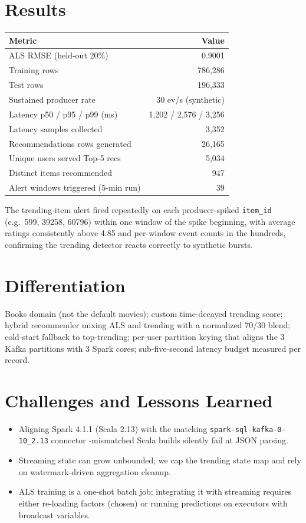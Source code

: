 \documentclass[11pt,a4paper]{article}
\begin{document}
\section{Results}
\begin{center}
\begin{tabular}{lr}
\toprule
\textbf{Metric} & \textbf{Value} \\
\midrule
ALS RMSE (held-out 20\%)            & 0.9001 \\
Training rows                        & 786{,}286 \\
Test rows                            & 196{,}333 \\
Sustained producer rate              & 30 ev/s (synthetic) \\
Latency p50 / p95 / p99 (ms)         & 1{,}202 / 2{,}576 / 3{,}256 \\
Latency samples collected            & 3{,}352 \\
Recommendations rows generated       & 26{,}165 \\
Unique users served Top-5 recs       & 5{,}034 \\
Distinct items recommended           & 947 \\
Alert windows triggered (5-min run)  & 39 \\
\bottomrule
\end{tabular}
\end{center}

The trending-item alert fired repeatedly on each producer-spiked
\texttt{item\_id} (e.g.\ 599, 39258, 60796) within one window of the spike
beginning, with average ratings consistently above 4.85 and per-window event
counts in the hundreds, confirming the trending detector reacts correctly to
synthetic bursts.

\section{Differentiation}
Books domain (not the default movies); custom time-decayed trending score;
hybrid recommender mixing ALS and trending with a normalized 70/30 blend;
cold-start fallback to top-trending; per-user partition keying that aligns the
3 Kafka partitions with 3 Spark cores; sub-five-second latency budget measured
per record.

\section{Challenges and Lessons Learned}
\begin{itemize}[noitemsep]
  \item Aligning Spark 4.1.1 (Scala 2.13) with the matching
        \texttt{spark-sql-kafka-0-10\_2.13} connector -mismatched Scala
        builds silently fail at JSON parsing.
  \item Streaming state can grow unbounded; we cap the trending state map and
        rely on watermark-driven aggregation cleanup.
  \item ALS training is a one-shot batch job; integrating it with streaming
        requires either re-loading factors (chosen) or running predictions on
        executors with broadcast variables.
\end{itemize}
\end{document}
